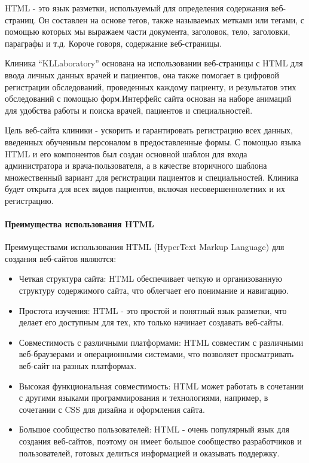 HTML - это язык разметки, используемый для определения содержания веб-страниц. Он составлен на основе тегов, также называемых метками или тегами, с помощью которых мы выражаем части документа, заголовок, тело, заголовки, параграфы и т.д. Короче говоря, содержание веб-страницы\cite{Html}.

Клиника ``KLLaboratory'' основана на использовании веб-страницы с HTML для ввода личных данных врачей и пациентов, она также помогает в цифровой регистрации обследований, проведенных каждому пациенту, и результатов этих обследований с помощью форм.Интерфейс сайта основан на наборе анимаций для удобства работы и поиска врачей, пациентов и специальностей.

Цель веб-сайта клиники - ускорить и гарантировать регистрацию всех данных, введенных обученным персоналом в предоставленные формы. С помощью языка HTML и его компонентов был создан основной шаблон для входа администратора и врача-пользователя, а в качестве вторичного шаблона множественный вариант для регистрации пациентов и специальностей. 
Клиника будет открыта для всех видов пациентов, включая несовершеннолетних и их регистрацию.

\paragraph{Преимущества использования HTML}

Преимуществами использования HTML (HyperText Markup Language) для создания веб-сайтов являются:

\begin{itemize}
	\item Четкая структура сайта: HTML обеспечивает четкую и организованную структуру содержимого сайта, что облегчает его понимание и навигацию.
	\item Простота изучения: HTML - это простой и понятный язык разметки, что делает его доступным для тех, кто только начинает создавать веб-сайты.
	\item Совместимость с различными платформами: HTML совместим с различными веб-браузерами и операционными системами, что позволяет просматривать веб-сайт на разных платформах.
	\item Высокая функциональная совместимость: HTML может работать в сочетании с другими языками программирования и технологиями, например, в сочетании с CSS для дизайна и оформления сайта.
	\item Большое сообщество пользователей: HTML - очень популярный язык для создания веб-сайтов, поэтому он имеет большое сообщество разработчиков и пользователей, готовых делиться информацией и оказывать поддержку.
\end{itemize}


